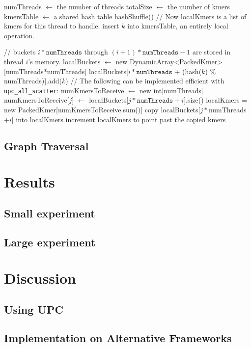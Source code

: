 \documentclass{article}
\begin{document}
\begin{algorithmic}
\State numThreads $\gets$ the number of threads
\State totalSize $\gets$ the number of kmers
\State kmersTable $\gets$ a shared hash table
\State hashShuffle()
\State // Now localKmers is a list of kmers for this thread to handle.
  \State insert $k$ into kmersTable, an entirely local operation.
\EndFor

  \State // buckets $i*\texttt{numThreads}$ through $(i+1)*\texttt{numThreads}-1$ are stored in thread $i$'s memory.
  \State localBuckets $\gets$ new DynamicArray<PackedKmer>[numThreads*numThreads]
    \State localBuckets[$i*\texttt{numThreads}$ + (hash($k$) $\%$ numThreads)].add($k$)
  \EndFor
    \State // The following can be implemented efficient with \texttt{upc\_all\_scatter}:
    \State numKmersToReceive $\gets$ new int[numThreads]
      \State numKmersToReceive[$j$] $\gets$ localBuckets[$j*\texttt{numThreads}+i$].size()
    \EndFor
    localKmers = new PackedKmer[numKmersToReceive.sum()]
      \State copy localBuckets[$j*$numThreads$+i$] into localKmers
      \State increment localKmers to point past the copied kmers
    \EndFor
  \EndFor
\EndFunction

\end{algorithmic}

\subsection{Graph Traversal}


\section{Results}
\subsection{Small experiment}
\subsection{Large experiment}

\section{Discussion}
\subsection{Using UPC}

\subsection{Implementation on Alternative Frameworks}

%
%
\end{document}
